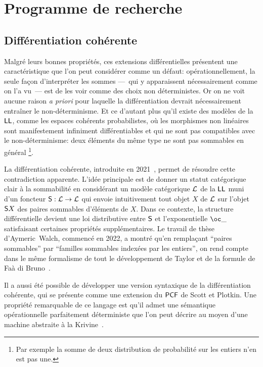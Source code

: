 \documentclass[a4]{article}
\begin{document}

\section*{Programme de recherche}

\subsection*{Différentiation cohérente}
Malgré leurs bonnes propriétés, ces extensions différentielles
présentent une caractéristique que l'on peut considérer comme un
défaut: opérationnellement, la seule façon d'interpréter les sommes
---~qui y apparaissent nécessairement comme on l'a vu~--- est de les
voir comme des choix non déterministes.
%
Or on ne voit aucune raison \emph{a priori} pour laquelle la
différentiation devrait nécessairement entraîner le non-déterminisme.
%
Et ce d'autant plus qu'il existe des modèles de la $\hbox{\textsf{LL}}$, comme les
espaces cohérents probabilistes, où les morphismes non linéaires sont
manifestement infiniment différentiables et qui ne sont pas
compatibles avec le non-déterminisme: deux éléments du même type ne
sont pas sommables en général%
\footnote{Par exemple la somme de deux distribution de probabilité sur
  les entiers n'en est pas une.}.

La différentiation cohérente, introduite en 2021~\cite{Ehrhard23a},
permet de résoudre cette contradiction apparente.
%
L'idée principale est de donner un statut catégorique clair à la
sommabilité en considérant un modèle catégorique $\mathcal{L}$ de la $\hbox{\textsf{LL}}$
muni d'un foncteur ${\mathsf S}:\mathcal{L}\to\mathcal{L}$ qui envoie intuitivement tout
objet $X$ de $\mathcal{L}$ sur l'objet ${\mathsf S} X$ des paires sommables
d'éléments de $X$.
%
Dans ce contexte, la structure différentielle devient une loi
distributive entre ${\mathsf S}$ et l'exponentielle $\Oc\_$ satisfaisant
certaines propriétés supplémentaires.
%
Le travail de thèse d'Aymeric~Walch, commencé en 2022, a montré qu'en
remplaçant ``paires sommables'' par ``familles sommables indexées par
les entiers'', on rend compte dans le même formalisme de tout le
développement de Taylor et de la formule de Faà di
Bruno~\cite{EhrhardWalch23b}.

Il a aussi été possible de développer une version syntaxique de la
différentiation cohérente, qui se présente comme une extension du
$\mathsf{PCF}$ de Scott et Plotkin.
%
Une propriété remarquable de ce langage est qu'il admet une sémantique
opérationnelle parfaitement déterministe que l'on peut décrire au
moyen d'une machine abstraite à la Krivine~\cite{Ehrhard23b}.
%
\end{document}
